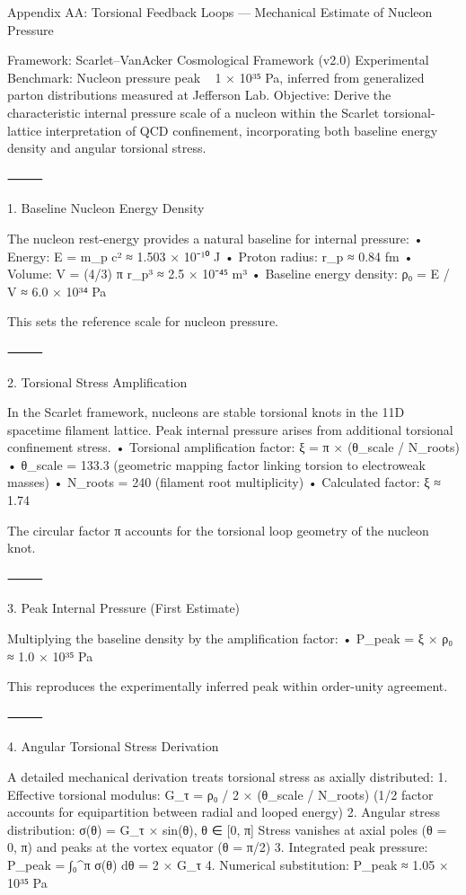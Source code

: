 Appendix AA: Torsional Feedback Loops — Mechanical Estimate of Nucleon Pressure

Framework: Scarlet–VanAcker Cosmological Framework (v2.0)
Experimental Benchmark: Nucleon pressure peak ~ 1 × 10³⁵ Pa, inferred from generalized parton distributions measured at Jefferson Lab.
Objective: Derive the characteristic internal pressure scale of a nucleon within the Scarlet torsional-lattice interpretation of QCD confinement, incorporating both baseline energy density and angular torsional stress.

⸻

1. Baseline Nucleon Energy Density

The nucleon rest-energy provides a natural baseline for internal pressure:
	•	Energy: E = m_p c² ≈ 1.503 × 10⁻¹⁰ J
	•	Proton radius: r_p ≈ 0.84 fm
	•	Volume: V = (4/3) π r_p³ ≈ 2.5 × 10⁻⁴⁵ m³
	•	Baseline energy density: ρ₀ = E / V ≈ 6.0 × 10³⁴ Pa

This sets the reference scale for nucleon pressure.

⸻

2. Torsional Stress Amplification

In the Scarlet framework, nucleons are stable torsional knots in the 11D spacetime filament lattice. Peak internal pressure arises from additional torsional confinement stress.
	•	Torsional amplification factor: ξ = π × (θ_scale / N_roots)
	•	θ_scale = 133.3 (geometric mapping factor linking torsion to electroweak masses)
	•	N_roots = 240 (filament root multiplicity)
	•	Calculated factor: ξ ≈ 1.74

The circular factor π accounts for the torsional loop geometry of the nucleon knot.

⸻

3. Peak Internal Pressure (First Estimate)

Multiplying the baseline density by the amplification factor:
	•	P_peak = ξ × ρ₀ ≈ 1.0 × 10³⁵ Pa

This reproduces the experimentally inferred peak within order-unity agreement.

⸻

4. Angular Torsional Stress Derivation

A detailed mechanical derivation treats torsional stress as axially distributed:
	1.	Effective torsional modulus: G_τ = ρ₀ / 2 × (θ_scale / N_roots)
(1/2 factor accounts for equipartition between radial and looped energy)
	2.	Angular stress distribution: σ(θ) = G_τ × sin(θ), θ ∈ [0, π]
Stress vanishes at axial poles (θ = 0, π) and peaks at the vortex equator (θ = π/2)
	3.	Integrated peak pressure: P_peak = ∫₀^π σ(θ) dθ = 2 × G_τ
	4.	Numerical substitution:
P_peak ≈ 1.05 × 10³⁵ Pa

